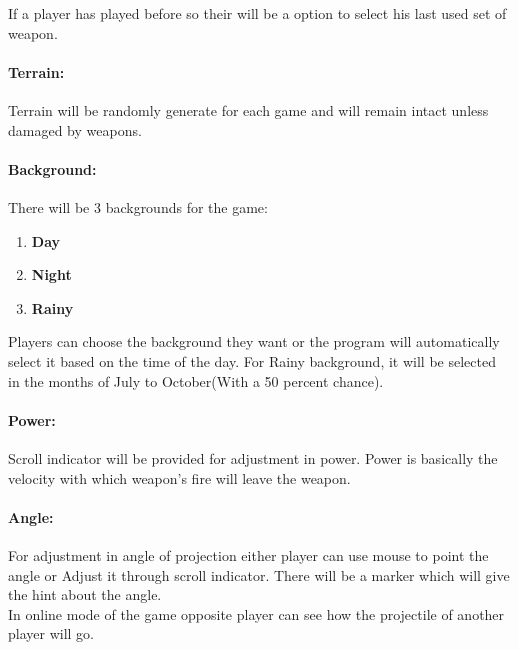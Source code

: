 \documentclass[12pt]{extarticle}
\begin{document}
If a player has played before so their will be a option to select his last used set of weapon.
\paragraph{Terrain:}
Terrain will be randomly generate for each game and will remain intact unless damaged by weapons.
		
\paragraph{Background:}
There will be 3 backgrounds for the game:
\begin{enumerate}
\item \textbf{Day}
\item \textbf{Night}
\item \textbf{Rainy}
\end{enumerate}
Players can choose the background they want or the program will automatically select it based on the time of the day. For Rainy background, it will be selected in the months of July to October(With a 50 percent chance).

\paragraph{Power:}
Scroll indicator will be provided for adjustment in power. Power is basically the velocity with which weapon's fire will leave the weapon.
\paragraph{Angle:}
For adjustment in angle of projection either player can use mouse to point the angle or Adjust it through scroll indicator. There will be a marker which will give the hint about the angle.
\\In online mode of the game opposite player can see how the projectile of another player will go.
\end{document}
